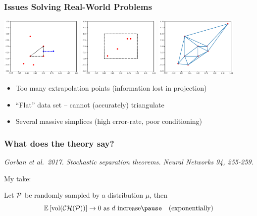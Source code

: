 \documentclass[aspectratio=169]{beamer}
\begin{document}
\begin{frame}\frametitle{Issues Solving Real-World Problems}

\includegraphics[width=0.3\textwidth]{ch-proj.eps}
\includegraphics[width=0.3\textwidth]{poor-condition-data.eps}
\includegraphics[width=0.3\textwidth]{unbalanced-simps.eps}

\begin{itemize}
\pause \item Too many extrapolation points (information lost in projection)
\pause \item ``Flat'' data set -- cannot (accurately) triangulate
\pause \item Several massive simplices (high error-rate, poor conditioning)
\end{itemize}

\end{frame}

\begin{frame}\frametitle{What does the theory say?}

\pause

{\small \it Gorban et al.\ 2017. Stochastic separation theorems.
Neural Networks 94, 255-259.}

\pause
\bigskip

My take:

Let ${\cal P}$ be randomly sampled by a distribution $\mu$,
then
\pause
$$
\mathbb{E}\left[ \text{vol}({\cal CH}({\cal P})) \right] \rightarrow 0
\text{ as $d$ increase}
\pause
\quad
\text{(exponentially)}
$$

\end{frame}
\end{document}
